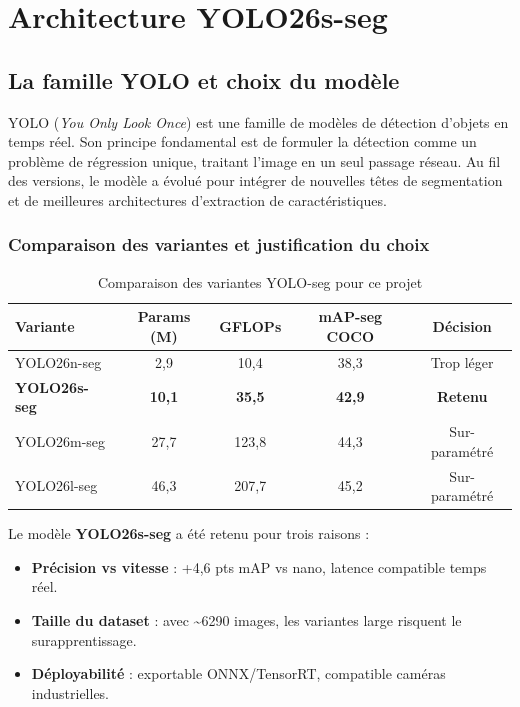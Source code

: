 \documentclass[12pt, a4paper]{report}
\begin{document}
\chapter{Architecture YOLO26s-seg}

\section{La famille YOLO et choix du modèle}

YOLO (\textit{You Only Look Once}) est une famille de modèles de détection d'objets en temps réel. Son principe fondamental est de formuler la détection comme un problème de régression unique, traitant l'image en un seul passage réseau. Au fil des versions, le modèle a évolué pour intégrer de nouvelles têtes de segmentation et de meilleures architectures d'extraction de caractéristiques.

\subsection{Comparaison des variantes et justification du choix}

\begin{table}[H]
  \centering
  \caption{Comparaison des variantes YOLO-seg pour ce projet}
  \label{tab:yolo_variants}
  \begin{tabular}{lcccc}
    \toprule
    \rowcolor{themebluevlight}
    \textbf{Variante} & \textbf{Params (M)} & \textbf{GFLOPs} & \textbf{mAP-seg COCO} & \textbf{Décision} \\
    \midrule
    YOLO26n-seg & 2,9  & 10,4  & 38,3 & Trop léger \\
    \rowcolor{greenok!15}
    \textbf{YOLO26s-seg} & \textbf{10,1} & \textbf{35,5} & \textbf{42,9} & \textbf{Retenu} \\
    YOLO26m-seg & 27,7 & 123,8 & 44,3 & Sur-paramétré \\
    YOLO26l-seg & 46,3 & 207,7 & 45,2 & Sur-paramétré \\
    \bottomrule
  \end{tabular}
\end{table}

Le modèle \textbf{YOLO26s-seg} a été retenu pour trois raisons :
\begin{itemize}
  \item \textbf{Précision vs vitesse} : +4,6 pts mAP vs nano, latence compatible temps réel.
  \item \textbf{Taille du dataset} : avec \textasciitilde6290 images, les variantes large risquent le surapprentissage.
  \item \textbf{Déployabilité} : exportable ONNX/TensorRT, compatible caméras industrielles.
\end{itemize}
\end{document}
